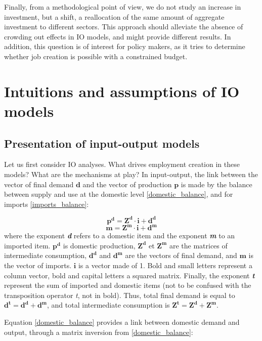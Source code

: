 Finally, from a methodological point of view, we do not study an increase in investment, but a shift, a reallocation of the same amount of aggregate investment to different sectors. This approach should alleviate the absence of crowding out effects in IO models, and might provide different results. In addition, this question is of interest for policy makers, as it tries to determine whether job creation is possible with a constrained budget.


\section{Intuitions and assumptions of IO models} \label{sec:intuition}

\subsection{Presentation of input-output models}
Let us first consider IO analyses. What drives employment creation in these models? What are the mechanisms at play?
In input-output, the link between the vector of final demand $\pmb{d}$ and the vector of production $\pmb{p}$ is made by the balance between supply and use at the domestic level \eqref{domestic_balance}, and for imports \eqref{imports_balance}:

\begin{equation}
\pmb{p^d} = \pmb{Z^d} \cdot \pmb{i} + \pmb{d^d}	
\label{domestic_balance}
\end{equation}
\begin{equation}
\pmb{m} = \pmb{Z^m} \cdot \pmb{i} + \pmb{d^m}	
\label{imports_balance}
\end{equation}
where the exponent \textit{\textbf{d}} refers to a domestic item and the exponent \textit{\textbf{m}} to an imported item. 
$\pmb{p^d}$ is domestic production, $\pmb{Z^d}$ et $\pmb{Z^m}$ are the matrices of intermediate consumption, $\pmb{d^d}$ and $\pmb{d^m}$ are the vectors of final demand, and $\pmb{m}$ is the vector of imports. 
$\pmb{i}$ is a vector made of 1. 
Bold and small letters represent a column vector, bold and capital letters a squared matrix. Finally, the exponent \textit{\textbf{t}} represent the sum of imported and domestic items (not to be confused with the transposition operator \textit{t}, not in bold). Thus, total final demand is equal to $\pmb{d^t=d^d+d^m}$, and total intermediate consumption is $\pmb{Z^t=Z^d+Z^m}$.

Equation \ref{domestic_balance} provides a link between domestic demand and output, through a matrix inversion from \ref{domestic_balance}:

